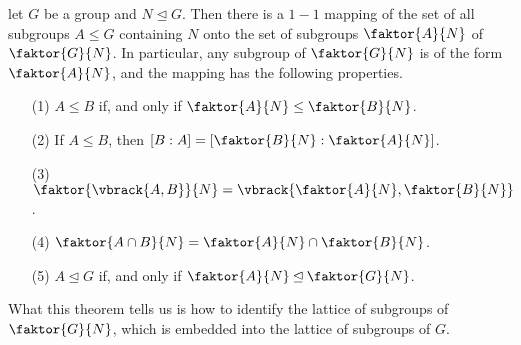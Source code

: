 \begin{theorem}\label{3.4.2}
    let $G$ be a group and  $N \unlhd G$. Then there is a  $1-1$ mapping of the
    set of all subgroups  $A \leq G$ containing $N$ onto the set of subgroups
    $\faktor{A}{N}$ of $\faktor{G}{N}$. In particular, any subgroup of
    $\faktor{G}{N}$ is of the form $\faktor{A}{N}$, and the mapping has the
    following properties.
    \begin{enumerate}
        \item[(1)] $A \leq B$ if, and only if  $\faktor{A}{N} \leq \faktor{B}{N}$.

        \item[(2)] If $A \leq B$, then  $[B:A]=[\faktor{B}{N} : \faktor{A}{N}]$.

        \item[(3)] $\faktor{\vbrack{A,B}}{N}=\vbrack{\faktor{A}{N},
            \faktor{B}{N}}$.

        \item[(4)] $\faktor{A \cap B}{N}=\faktor{A}{N} \cap \faktor{B}{N}$.

        \item[(5)] $A \unlhd G$ if, and only if  $\faktor{A}{N} \unlhd
            \faktor{G}{N}$.
    \end{enumerate}
\end{theorem}
\begin{remark}
    What this theorem tells us is how to identify the lattice of subgroups of
    $\faktor{G}{N}$, which is embedded into the lattice of subgroups of $G$.
\end{remark}

